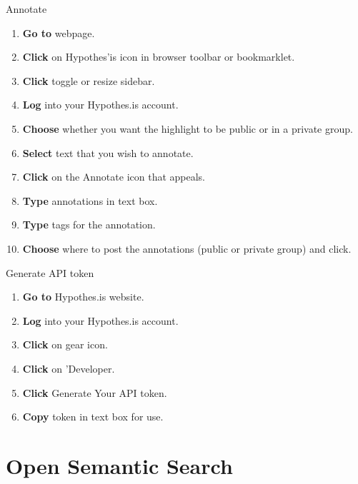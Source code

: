 \documentclass[10pt,a4paper]{article}
\begin{document}
\begin{textbox}{Annotate}
 

  

\begin{enumerate}
\item \textbf{Go to} webpage. 
\item \textbf{Click} on Hypothes'is icon in browser toolbar or bookmarklet.
\item \textbf{Click} toggle or resize sidebar.
\item \textbf{Log} into your Hypothes.is account.
\item \textbf{Choose} whether you want the highlight to be public or in a private group.
\item \textbf{Select} text that you wish to annotate.
\item \textbf{Click} on the Annotate icon that appeals.
\item \textbf{Type} annotations in text box.
\item \textbf{Type} tags for the annotation.
\item \textbf{Choose} where to post the annotations (public or private group) and click. 

\end{enumerate}

\end{textbox}


\begin{textbox}{Generate API token}
 

  

\begin{enumerate}
\item \textbf{Go to} Hypothes.is website. 
\item \textbf{Log} into your Hypothes.is account.
\item \textbf{Click} on gear icon.
\item \textbf{Click} on 'Developer.
\item \textbf{Click} Generate Your API token.
\item \textbf{Copy} token in text box for use.

\end{enumerate}

\end{textbox}


\section{Open Semantic Search}
\end{document}
